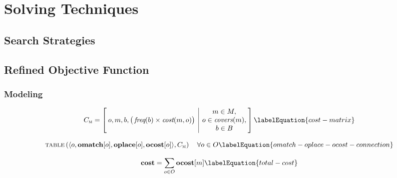 %

\chapter{Solving Techniques}



\section{Search Strategies}

\section{Refined Objective Function}
\subsection{Modeling}

\begin{equation}
  \mCostMatrix =
  \begin{bmatrix}
    \begin{array}{@{\:}c|c@{\:}}
        o, m, b, \big( \mFreq(b) \times \mOpCost(m, o) \big)
      & \begin{array}{@{}c@{}}
          m \in \mMatchSet, \\
          o \in \mCovers(m), \\
          b \in \mBlockSet \\
        \end{array}
    \end{array}
  \end{bmatrix}
  \labelEquation{cost-matrix}
\end{equation}

\begin{equation}
  \mTable\left(
    \langle
      o,
      \mVar{omatch}[o],
      \mVar{oplace}[o],
      \mVar{ocost}[o]
    \rangle,
    \mCostMatrix
  \right)
  \mQuantSep
  \forall o \in \mOpSet
  \labelEquation{omatch-oplace-ocost-connection}
\end{equation}

\begin{equation}
  \mVar{cost} = \sum_{o \in \mOpSet} \mVar{ocost}[m]
  \labelEquation{total-cost}
\end{equation}

